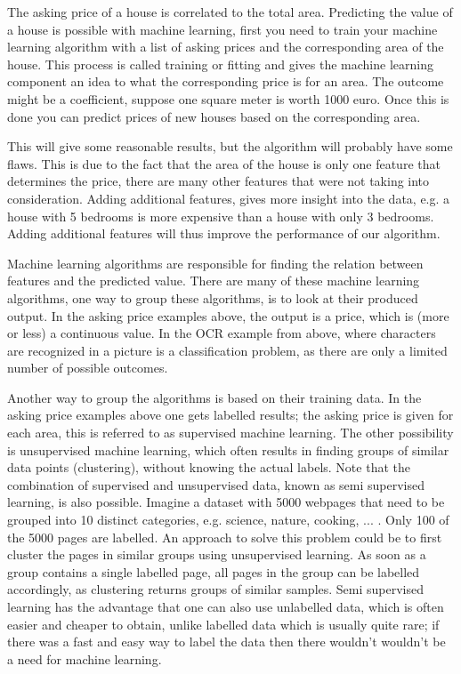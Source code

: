 \npar

The asking price of a house is correlated to the total area. Predicting the value of a house is possible with machine learning, first you need to train your machine learning algorithm with a list of asking prices and the corresponding area of the house. This process is called training or fitting and gives the machine learning component an idea to what the corresponding price is for an area. The outcome might be a coefficient, suppose one square meter is worth 1000 euro. Once this is done you can predict prices of new houses based on the corresponding area. 

\npar

This will give some reasonable results, but the algorithm will probably have some flaws. This is due to the fact that the area of the house is only one feature that determines the price, there are many other features that were not taking into consideration. Adding additional features, gives more insight into the data, e.g. a house with 5 bedrooms is more expensive than a house with only 3 bedrooms. Adding additional features will thus improve the performance of our algorithm.

\npar

Machine learning algorithms are responsible for finding the relation between features and the predicted value. There are many of these machine learning algorithms, one way to group these algorithms, is to look at their produced output. In the asking price examples above, the output is a price, which is (more or less) a continuous value. In the OCR example from above, where characters are recognized in a picture is a classification problem, as there are only a limited number of possible outcomes. 

\npar

Another way to group the algorithms is based on their training data. In the asking price examples above one gets labelled results; the asking price is given for each area, this is referred to as supervised machine learning. The other possibility is unsupervised machine learning, which often results in finding groups of similar data points (clustering), without knowing the actual labels. Note that the combination of supervised and unsupervised data, known as semi supervised learning, is also possible. Imagine a dataset with 5000 webpages that need to be grouped into 10 distinct categories, e.g. science, nature, cooking, ... . Only 100 of the 5000 pages are labelled. An approach to solve this problem could be to first cluster the pages in similar groups using unsupervised learning. As soon as a group contains a single labelled page, all pages in the group can be labelled accordingly, as clustering returns groups of similar samples. Semi supervised learning has the advantage that one can also use unlabelled data, which is often easier and cheaper to obtain, unlike labelled data which is usually quite rare; if there was a fast and easy way to label the data then there wouldn't wouldn't be a need for machine learning.

